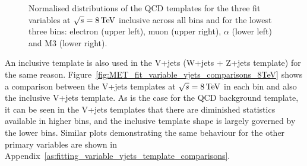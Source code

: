 \begin{figure}[hbtp]
	 \caption{Normalised distributions of the QCD templates for the three fit variables at $\sqrt{s}=8\,\text{Te\hspace{-.08em}V}$
	 inclusive across all \met bins and for the lowest three \met bins: electron \abseta (upper
	 left), muon \abseta (upper right), $\alpha$ (lower left) and M3 (lower right).}
     \label{fig:fit_variable_qcd_comparisons_8TeV}
\end{figure}

An inclusive template is also used in the V+jets (W+jets + Z+jets template) for the same reason.
Figure~\ref{fig:MET_fit_variable_vjets_comparisons_8TeV} shows a comparison between the V+jets templates at
$\sqrt{s}=8\,\text{Te\hspace{-.08em}V}$ in each \met bin and also the inclusive \met V+jets template.
As is the case for the QCD background template, it can be seen in the V+jets templates that there are
diminished statistics available in higher bins, and the inclusive template shape is largely governed by the
lower bins. Similar plots demonstrating the same behaviour for the other primary variables are shown in
Appendix~\ref{as:fitting_variable_vjets_template_comparisons}.

